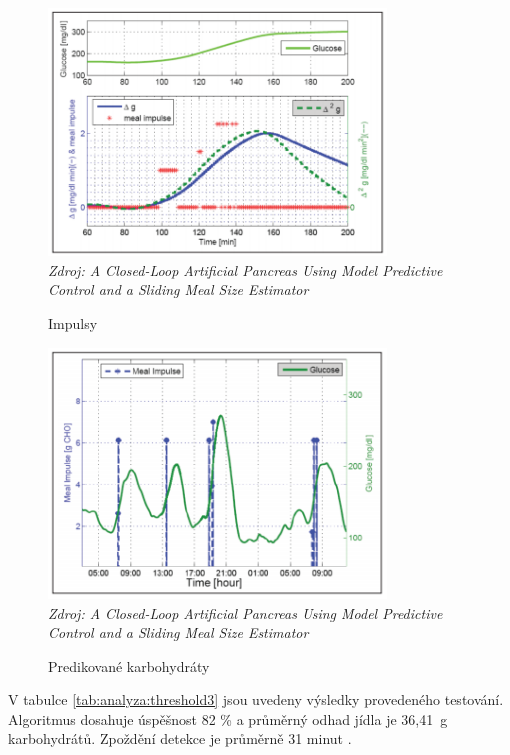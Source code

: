 \begin{figure}[H]
\caption{Impulsy}
\label{fig:analyza:threshold1}
\centering
\includegraphics[width=0.8\textwidth]{img/analyzaCHO/threshold1.png}\\
\textit{Zdroj: A Closed-Loop Artificial Pancreas Using Model Predictive Control and a Sliding Meal Size Estimator \citep{analyzaCHO.Thresholds}}
\end{figure}
\begin{figure}[H]
\caption{Predikované karbohydráty}
\label{fig:analyza:threshold2}
\centering
\includegraphics[width=0.8\textwidth]{img/analyzaCHO/threshold2.png}\\
\textit{Zdroj: A Closed-Loop Artificial Pancreas Using Model Predictive Control and a Sliding Meal Size Estimator \citep{analyzaCHO.Thresholds}}
\end{figure}

V tabulce \ref{tab:analyza:threshold3} jsou uvedeny výsledky provedeného testování. Algoritmus dosahuje úspěšnost 82 \% a průměrný odhad jídla je 36,41~g karbohydrátů. Zpoždění detekce je průměrně 31 minut \citep{analyzaCHO.Thresholds}.


